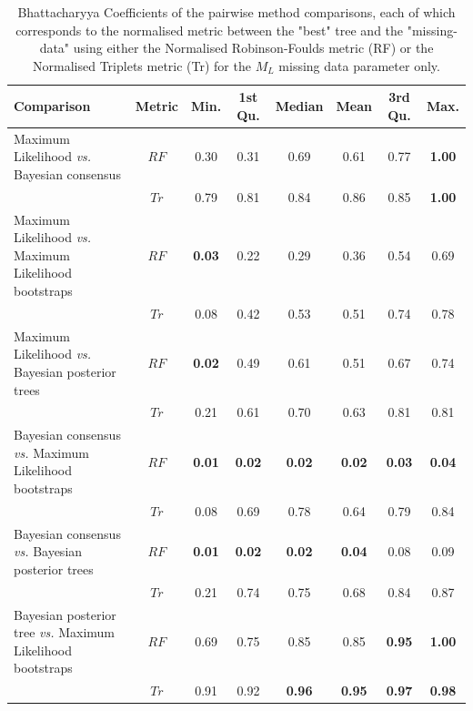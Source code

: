 \begin{landscape}
\begin{table}[!htb]
\caption[Bhattacharyya Coefficients of the pairwise method comparisons ($M_{L}$).]{Bhattacharyya Coefficients of the pairwise method comparisons, each of which corresponds to the normalised metric between the "best" tree and the "missing-data" using either the Normalised Robinson-Foulds metric (RF) or the Normalised Triplets metric (Tr) for the $M_{L}$ missing data parameter only.}
\label{Tab_Supp_summary_BC_ML}
\centering
\begin{tabular}{lccccccc}
  \hline
 Comparison &  Metric & Min. & 1st Qu. & Median & Mean & 3rd Qu. & Max. \\ 
  \hline
    Maximum Likelihood \textit{vs.} Bayesian consensus                 & $RF$ & 0.30 & 0.31 & 0.69 & 0.61 & 0.77 & \textbf{1.00} \\ 
                                                                       & $Tr$ & 0.79 & 0.81 & 0.84 & 0.86 & 0.85 & \textbf{1.00} \\ 
    Maximum Likelihood \textit{vs.} Maximum Likelihood bootstraps      & $RF$ & \textbf{0.03} & 0.22 & 0.29 & 0.36 & 0.54 & 0.69 \\ 
                                                                       & $Tr$ & 0.08 & 0.42 & 0.53 & 0.51 & 0.74 & 0.78 \\ 
    Maximum Likelihood \textit{vs.} Bayesian posterior trees           & $RF$ & \textbf{0.02} & 0.49 & 0.61 & 0.51 & 0.67 & 0.74 \\ 
                                                                       & $Tr$ & 0.21 & 0.61 & 0.70 & 0.63 & 0.81 & 0.81 \\ 
    Bayesian consensus \textit{vs.} Maximum Likelihood bootstraps      & $RF$ & \textbf{0.01} & \textbf{0.02} & \textbf{0.02} & \textbf{0.02} & \textbf{0.03} & \textbf{0.04} \\ 
                                                                       & $Tr$ & 0.08 & 0.69 & 0.78 & 0.64 & 0.79 & 0.84 \\ 
    Bayesian consensus \textit{vs.} Bayesian posterior trees           & $RF$ & \textbf{0.01} & \textbf{0.02} & \textbf{0.02} & \textbf{0.04} & 0.08 & 0.09 \\ 
                                                                       & $Tr$ & 0.21 & 0.74 & 0.75 & 0.68 & 0.84 & 0.87 \\ 
    Bayesian posterior tree \textit{vs.} Maximum Likelihood bootstraps & $RF$ & 0.69 & 0.75 & 0.85 & 0.85 & \textbf{0.95} & \textbf{1.00} \\ 
                                                                       & $Tr$ & 0.91 & 0.92 & \textbf{0.96} & \textbf{0.95} & \textbf{0.97} & \textbf{0.98} \\ 
   \hline
\end{tabular}
\end{table}
\end{landscape}

